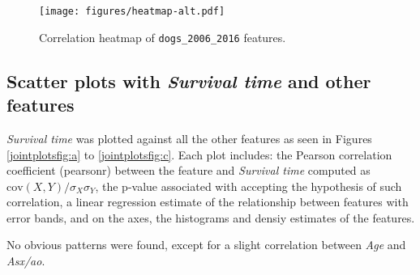 \documentclass[12pt]{report}
\begin{document}
\begin{figure}[h]
  \centering
  	\texttt{[image: figures/heatmap-alt.pdf]}
  \caption{Correlation heatmap of \texttt{dogs\_2006\_2016} features.}
  \label{corrheatmap}
\end{figure}

\subsection*{Scatter plots with \textit{Survival time} and other features}
\textit{Survival time} was plotted against all the other features as seen in Figures \ref{jointplotsfig:a} to \ref{jointplotsfig:c}. Each plot includes: the Pearson correlation coefficient (pearsonr) between the feature and \textit{Survival time} computed as $\text{cov}(X,Y) / \sigma_{X}\sigma_{Y}$, the p-value associated with accepting the hypothesis of such correlation, a linear regression estimate of the relationship between features with error bands, and on the axes, the histograms and densiy estimates of the features.

No obvious patterns were found, except for a slight correlation between \textit{Age} and \textit{Asx/ao}.
\end{document}
